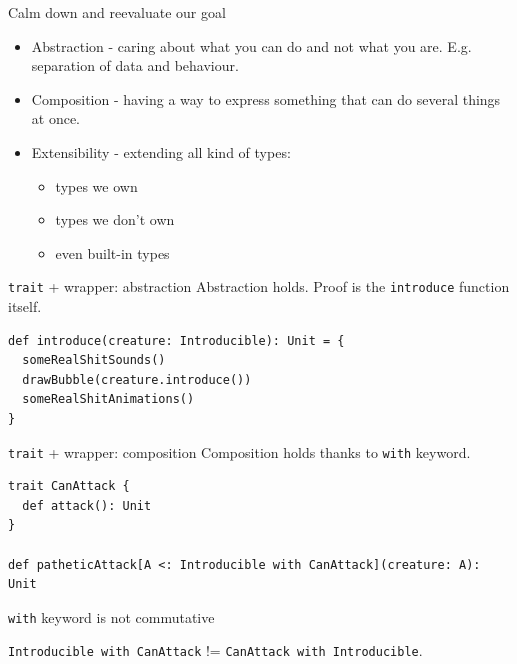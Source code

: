 \documentclass[presentation,aspectratio=169,smaller]{beamer}
\begin{document}
\begin{frame}[label={sec:org4b82d10}]{Calm down and reevaluate our goal}
\begin{itemize}
\item Abstraction - caring about what you can do and not what you are. E.g.
separation of data and behaviour.
\end{itemize}
\pause
\begin{itemize}
\item Composition - having a way to express something that can do several things at
once.
\end{itemize}
\pause
\begin{itemize}
\item Extensibility - extending all kind of types:
\begin{itemize}
\item types we own
\item types we don't own
\item even built-in types
\end{itemize}
\end{itemize}
\end{frame}

\begin{frame}[label={sec:orgebbb7c6},fragile]{\texttt{trait} + wrapper: abstraction}
 Abstraction holds. Proof is the \texttt{introduce} function itself.

\begin{verbatim}
def introduce(creature: Introducible): Unit = {
  someRealShitSounds()
  drawBubble(creature.introduce())
  someRealShitAnimations()
}
\end{verbatim}
\end{frame}

\begin{frame}[label={sec:org00eab75},fragile]{\texttt{trait} + wrapper: composition}
 Composition holds thanks to \texttt{with} keyword.

\pause

\begin{verbatim}
trait CanAttack {
  def attack(): Unit
}

def patheticAttack[A <: Introducible with CanAttack](creature: A): Unit
\end{verbatim}

\pause

\texttt{with} keyword is not commutative

\texttt{Introducible with CanAttack} != \texttt{CanAttack with Introducible}.
\end{frame}
\end{document}
